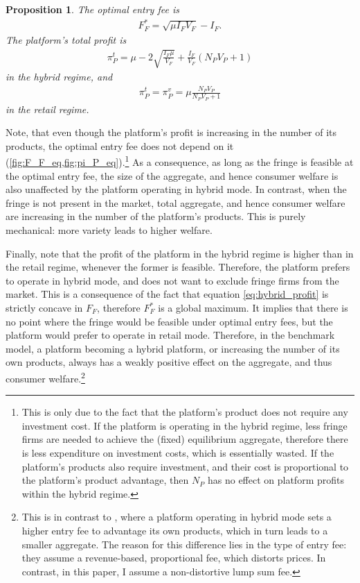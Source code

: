\documentclass[a4paper]{article}
\newtheorem{proposition}{Proposition}
\begin{document}
\begin{proposition}
    \label{prop:optimal_entry_fee}
    The optimal entry fee is
    \begin{align*}
        F_F^* = \sqrt{\mu I_F V_F} - I_F.
    \end{align*}
    The platform's total profit is
    \begin{align*}
        \pi_P^{t} = \mu - 2\sqrt{\frac{I_F \mu}{V_F}} + \frac{I_F}{V_F} (N_P V_P + 1)
    \end{align*}
    in the hybrid regime, and
    \begin{align*}
        \pi_P^{t} = \pi_P^{v} = \mu \frac{ N_P V_P}{N_P V_P + 1}
    \end{align*}
    in the retail regime.
\end{proposition}
Note, that even though the platform's profit is increasing in the number of its products, the optimal entry fee does not depend on it (\cref{fig:F_F_eq,fig:pi_P_eq}).\footnote{
    This is only due to the fact that the platform's product does not require any investment cost.
    If the platform is operating in the hybrid regime, less fringe firms are needed to achieve the (fixed) equilibrium aggregate, therefore there is less expenditure on investment costs, which is essentially wasted.
    If the platform's products also require investment, and their cost is proportional to the platform's product advantage, then $N_P$ has no effect on platform profits within the hybrid regime.
}
As a consequence, as long as the fringe is feasible at the optimal entry fee, the size of the aggregate, and hence consumer welfare is also unaffected by the platform operating in hybrid mode.
In contrast, when the fringe is not present in the market, total aggregate, and hence consumer welfare are increasing in the number of the platform's products.
This is purely mechanical: more variety leads to higher welfare.

Finally, note that the profit of the platform in the hybrid regime is higher than in the retail regime, whenever the former is feasible.
Therefore, the platform prefers to operate in hybrid mode, and does not want to exclude fringe firms from the market.
This is a consequence of the fact that equation \eqref{eq:hybrid_profit} is strictly concave in $F_F$, therefore $F_F^*$ is a global maximum.
It implies that there is no point where the fringe would be feasible under optimal entry fees, but the platform would prefer to operate in retail mode.
Therefore, in the benchmark model, a platform becoming a hybrid platform, or increasing the number of its own products, always has a weakly positive effect on the aggregate, and thus consumer welfare.\footnote{
    This is in contrast to \textcite{anderson2021hybrid}, where a platform operating in hybrid mode sets a higher entry fee to advantage its own products, which in turn leads to a smaller aggregate.
    The reason for this difference lies in the type of entry fee: they assume a revenue-based, proportional fee, which distorts prices.
    In contrast, in this paper, I assume a non-distortive lump sum fee.
}
\end{document}
